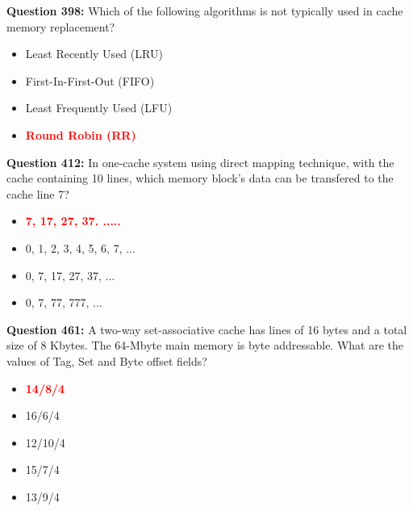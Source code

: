 \documentclass[12pt,a4paper]{article}
\begin{document}
\vspace{0.5cm}

\vspace{0.5cm}

\textbf{Question 398:} Which of the following algorithms is not typically used in cache memory replacement?

\begin{itemize}
    \item[\textbf{A.}] Least Recently Used (LRU)
    \item[\textbf{B.}] First-In-First-Out (FIFO)
    \item[\textbf{C.}] Least Frequently Used (LFU)
    \item[\textbf{D.}] \textcolor{red}{\textbf{Round Robin (RR)}}
\end{itemize}

\vspace{0.5cm}

\vspace{0.5cm}

\textbf{Question 412:} In one-cache system using direct mapping technique, with the cache containing 10 lines, which memory block's data can be transfered to the cache line 7?

\begin{itemize}
    \item[\textbf{A.}] \textcolor{red}{\textbf{7, 17, 27, 37. .....}}
    \item[\textbf{B.}] 0, 1, 2, 3, 4, 5, 6, 7, ...
    \item[\textbf{C.}] 0, 7, 17, 27, 37, ...
    \item[\textbf{D.}] 0, 7, 77, 777, ...
\end{itemize}

\vspace{0.5cm}

\vspace{0.5cm}

\textbf{Question 461:} A two-way set-associative cache has lines of 16 bytes and a total size of 8 Kbytes. The 64-Mbyte main memory is byte addressable. What are the values of Tag, Set and Byte offset fields?

\begin{itemize}
    \item[\textbf{A.}] \textcolor{red}{\textbf{14/8/4}}
    \item[\textbf{B.}] 16/6/4
    \item[\textbf{C.}] 12/10/4
    \item[\textbf{D.}] 15/7/4
    \item[\textbf{E.}] 13/9/4
\end{itemize}
\end{document}
